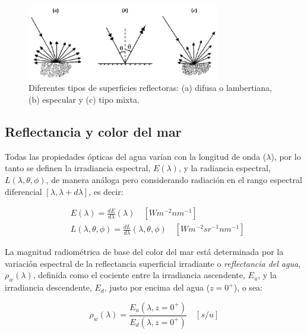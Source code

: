             \begin{figure}
            \centering
            \includegraphics[width=0.75\textwidth]{int/figures/lambertiana}
            \caption[Diferentes tipos de superficies reflectoras: difusa, especular y mixta.]{Diferentes tipos de superficies reflectoras: (a) difusa o lambertiana, (b) especular y (c) tipo mixta.} 
            \label{int:lambertiana}
            \end{figure}
        
	\subsection{Reflectancia y color del mar}
	\label{int:s:reflectancia}

        Todas las propiedades ópticas del agua varían con la longitud de onda ($\lambda$), por lo tanto se definen la irradiancia espectral, $E(\lambda)$, y la radiancia espectral, $L(\lambda,\theta,\phi)$, de manera análoga pero considerando radiación en el rango espectral diferencial $[\lambda,\lambda+d\lambda]$, es decir:

        \begin{align}
         &E(\lambda)=\frac{d E}{d\lambda}(\lambda) \quad [W m^{-2} nm^{-1}] \\
         &L(\lambda,\theta,\phi)=\frac{d L}{d\lambda}(\lambda,\theta,\phi) \quad [W m^{-2} sr^{-1} nm^{-1}]
        \label{int:eq:depEspectral}
        \end{align}
        
        La magnitud radiométrica de base del color del mar está determinada por la variación espectral de la reflectancia superficial irradiante o \textit{reflectancia del agua}, $\rho_{w}(\lambda)$, definida como el cociente entre la irradiancia ascendente, $E_{u}$, y la irradiancia descendente, $E_{d}$, justo por encima del agua ($z=0^{+}$), o sea:
        
        \begin{equation}
        \rho_{w}(\lambda)=\frac{E_{u}(\lambda,z=0^{+})}{E_{d}(\lambda,z=0^{+})} \quad [s/u]
        \label{int:eq:reflectancia}
        \end{equation}
        
